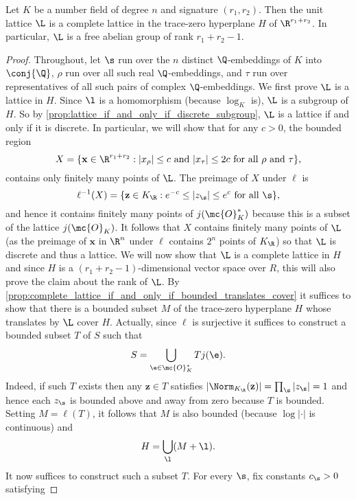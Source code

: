     \begin{theorem}\label{thm:unit_group_complete_lattice}
      Let $K$ be a number field of degree $n$ and signature $(r_{1},r_{2})$. Then the unit lattice $\L$ is a complete lattice in the trace-zero hyperplane $H$ of $\R^{r_{1}+r_{2}}$. In particular, $\L$ is a free abelian group of rank $r_{1}+r_{2}-1$.
    \end{theorem}
    \begin{proof}
      Throughout, let $\s$ run over the $n$ distinct $\Q$-embeddings of $K$ into $\conj{\Q}$, $\rho$ run over all such real $\Q$-embeddings, and $\tau$ run over representatives of all such pairs of complex $\Q$-embeddings. We first prove $\L$ is a lattice in $H$. Since $\l$ is a homomorphism (because $\log_{K}$ is), $\L$ is a subgroup of $H$. So by \cref{prop:lattice_if_and_only_if_discrete_subgroup}, $\L$ is a lattice if and only if it is discrete. In particular, we will show that for any $c > 0$, the bounded region
      \[
        X = \{\mathbf{x} \in \R^{r_{1}+r_{2}}:\text{$|x_{\rho}| \le c$ and $|x_{\tau}| \le 2c$ for all $\rho$ and $\tau$}\},
      \]
      contains only finitely many points of $\L$. The preimage of $X$ under $\ell$ is
      \[
        \ell^{-1}(X) = \{\mathbf{z} \in K_{\R}:\text{$e^{-c} \le |z_{\s}| \le e^{c}$ for all $\s$}\},
      \]
      and hence it contains finitely many points of $j(\mc{O}_{K}^{\ast})$ because this is a subset of the lattice $j(\mc{O}_{K})$. It follows that $X$ contains finitely many points of $\L$ (as the preimage of $\mathbf{x}$ in $\R^{n}$ under $\ell$ contains $2^{n}$ points of $K_{\R}$) so that $\L$ is discrete and thus a lattice. We will now show that $\L$ is a complete lattice in $H$ and since $H$ is a $(r_{1}+r_{2}-1)$-dimensional vector space over $R$, this will also prove the claim about the rank of $\L$. By \cref{prop:complete_lattice_if_and_only_if_bounded_translates_cover} it suffices to show that there is a bounded subset $M$ of the trace-zero hyperplane $H$ whose translates by $\L$ cover $H$. Actually, since $\ell$ is surjective it suffices to construct a bounded subset $T$ of $S$ such that
      \[
        S = \bigcup_{\e \in \mc{O}_{K}^{\ast}}Tj(\e).
      \]
      Indeed, if such $T$ exists then any $\mathbf{z} \in T$ satisfies $|\Norm_{K_{\R}}(\mathbf{z})| = \prod_{\s}|z_{\s}| = 1$ and hence each $z_{\s}$ is bounded above and away from zero because $T$ is bounded. Setting $M = \ell(T)$, it follows that $M$ is also bounded (because $\log|\cdot|$ is continuous) and
      \[
        H = \bigcup_{\l}(M+\l).
      \]
      It now suffices to construct such a subset $T$. For every $\s$, fix constants $c_{\s} > 0$ satisfying

\end{proof}
